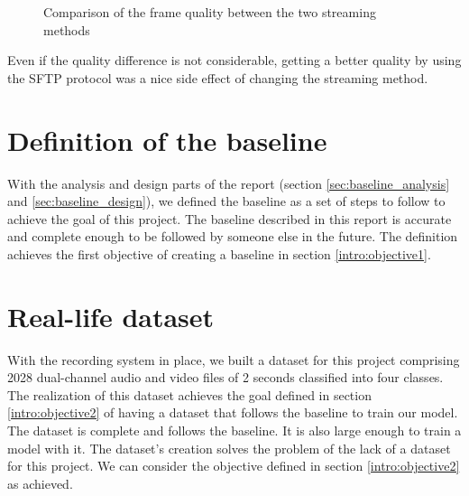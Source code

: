 \begin{figure}[H]
    \centering
    \qquad
    \caption{Comparison of the frame quality between the two streaming methods}
    \label{fig:streaming}
\end{figure}

Even if the quality difference is not considerable, getting a better quality by using the SFTP protocol was a nice side effect of changing the streaming method.

\section{Definition of the baseline}

With the analysis and design parts of the report (section \ref{sec:baseline_analysis} and \ref{sec:baseline_design}), we defined the baseline as a set of steps to follow to achieve the goal of this project. The baseline described in this report is accurate and complete enough to be followed by someone else in the future. The definition achieves the first objective of creating a baseline in section \ref{intro:objective1}. 

\section{Real-life dataset}

With the recording system in place, we built a dataset for this project comprising 2028 dual-channel audio and video files of 2 seconds classified into four classes. The realization of this dataset achieves the goal defined in section \ref{intro:objective2} of having a dataset that follows the baseline to train our model. The dataset is complete and follows the baseline. It is also large enough to train a model with it. The dataset's creation solves the problem of the lack of a dataset for this project. We can consider the objective defined in section \ref{intro:objective2} as achieved.

